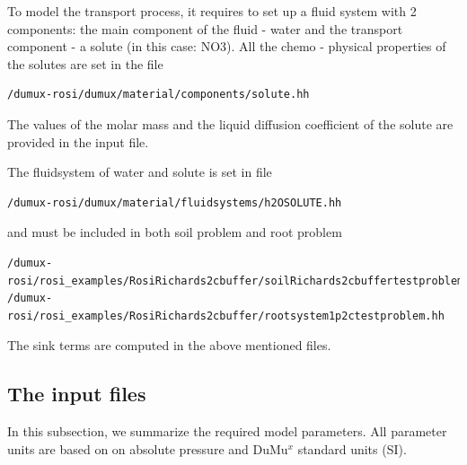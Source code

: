 To model the transport process, it requires to set up a fluid system
with 2 components: the main component of the fluid - water and the
transport component - a solute (in this case: NO3).
All the chemo - physical properties of the solutes are set in the file

\begin{lstlisting}
/dumux-rosi/dumux/material/components/solute.hh
\end{lstlisting}


The values of the molar mass and the liquid diffusion coefficient of the solute are provided in the input file. 

The fluidsystem of water and solute is set in file

\begin{lstlisting}
/dumux-rosi/dumux/material/fluidsystems/h2OSOLUTE.hh
\end{lstlisting}

and must be included in both soil problem and root problem

\begin{lstlisting}
/dumux-rosi/rosi_examples/RosiRichards2cbuffer/soilRichards2cbuffertestproblem.hh
/dumux-rosi/rosi_examples/RosiRichards2cbuffer/rootsystem1p2ctestproblem.hh
\end{lstlisting}


The sink terms are computed in the above mentioned files.





\subsection*{The input files}

In this subsection, we summarize the required model parameters. All
parameter units are based on on absolute pressure and DuMu$^{x}$
standard units (SI).

